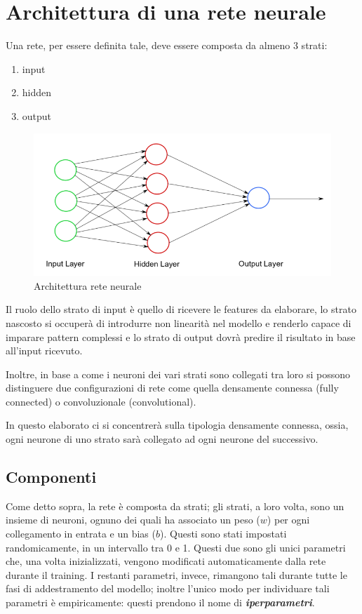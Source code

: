 \documentclass[12pt]{report}
\begin{document}
\section{Architettura di una rete neurale}
Una rete, per essere definita tale, deve essere composta da almeno 3 strati:
\begin{enumerate}
\item{input}
\item{hidden}
\item{output}
\end{enumerate}

\begin{figure}
\includegraphics[scale=0.5]{nn_arch.png}
\caption{Architettura rete neurale}
\end{figure}

Il ruolo dello strato di input è quello di ricevere le features da elaborare, lo strato nascosto si occuperà di introdurre non linearità nel modello e renderlo capace di imparare pattern complessi e lo strato di output dovrà predire il risultato in base all’input ricevuto.

Inoltre, in base a come i neuroni dei vari strati sono collegati tra loro si possono distinguere due configurazioni di rete come quella densamente connessa (fully connected) o convoluzionale (convolutional).

In questo elaborato ci si concentrerà sulla tipologia densamente connessa, ossia, ogni neurone di uno strato sarà collegato ad ogni neurone del successivo.

\subsection{Componenti}
Come detto sopra, la rete è composta da strati; gli strati, a loro volta, sono un insieme di neuroni, ognuno dei quali ha associato un peso ($w$) per ogni collegamento in entrata e un bias ($b$). Questi sono stati impostati randomicamente, in un intervallo tra 0 e 1. Questi due sono gli unici parametri che, una volta inizializzati, vengono modificati automaticamente dalla rete durante il training. I restanti parametri, invece, rimangono tali durante tutte le fasi di addestramento del modello; inoltre l'unico modo per individuare tali parametri è empiricamente: questi prendono il nome di \textbf{\textit{iperparametri}}.
\end{document}
